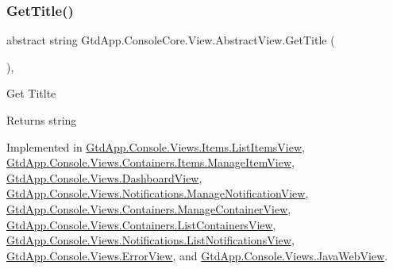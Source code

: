 \mbox{\label{class_gtd_app_1_1_console_core_1_1_view_1_1_abstract_view_ada76ebf03434f22dbd103a09f292ff7c}} 
\subsubsection{\texorpdfstring{Get\+Title()}{GetTitle()}}
{\footnotesize\ttfamily abstract string Gtd\+App.\+Console\+Core.\+View.\+Abstract\+View.\+Get\+Title (\begin{DoxyParamCaption}{ }\end{DoxyParamCaption})\hspace{0.3cm}{\ttfamily [protected]}, {}}



Get Titlte 

\begin{DoxyReturn}{Returns}
string
\end{DoxyReturn}


Implemented in \mbox{\hyperlink{class_gtd_app_1_1_console_1_1_views_1_1_items_1_1_list_items_view_a0c378daa3b8350805980a2def53772a0}{Gtd\+App.\+Console.\+Views.\+Items.\+List\+Items\+View}}, \mbox{\hyperlink{class_gtd_app_1_1_console_1_1_views_1_1_containers_1_1_items_1_1_manage_item_view_a3e143497b8e9cb697f2863ab9d611644}{Gtd\+App.\+Console.\+Views.\+Containers.\+Items.\+Manage\+Item\+View}}, \mbox{\hyperlink{class_gtd_app_1_1_console_1_1_views_1_1_dashboard_view_a4a79eed87af25262f6b75e8d7641806c}{Gtd\+App.\+Console.\+Views.\+Dashboard\+View}}, \mbox{\hyperlink{class_gtd_app_1_1_console_1_1_views_1_1_notifications_1_1_manage_notification_view_a400ecb489c2328d49e6cd13f4d60cb79}{Gtd\+App.\+Console.\+Views.\+Notifications.\+Manage\+Notification\+View}}, \mbox{\hyperlink{class_gtd_app_1_1_console_1_1_views_1_1_containers_1_1_manage_container_view_a027fb56977b1f2937bcf3fbd42505b57}{Gtd\+App.\+Console.\+Views.\+Containers.\+Manage\+Container\+View}}, \mbox{\hyperlink{class_gtd_app_1_1_console_1_1_views_1_1_containers_1_1_list_containers_view_a27b68fb8c16a49dbd3b85942851208b9}{Gtd\+App.\+Console.\+Views.\+Containers.\+List\+Containers\+View}}, \mbox{\hyperlink{class_gtd_app_1_1_console_1_1_views_1_1_notifications_1_1_list_notifications_view_ab0abe8717bb2639f7b28af3faedc02ac}{Gtd\+App.\+Console.\+Views.\+Notifications.\+List\+Notifications\+View}}, \mbox{\hyperlink{class_gtd_app_1_1_console_1_1_views_1_1_error_view_a877430d97de101a08a4d0894ccaf41c0}{Gtd\+App.\+Console.\+Views.\+Error\+View}}, and \mbox{\hyperlink{class_gtd_app_1_1_console_1_1_views_1_1_java_web_view_ac03ca3383ead82e7775e417db086ac76}{Gtd\+App.\+Console.\+Views.\+Java\+Web\+View}}.

